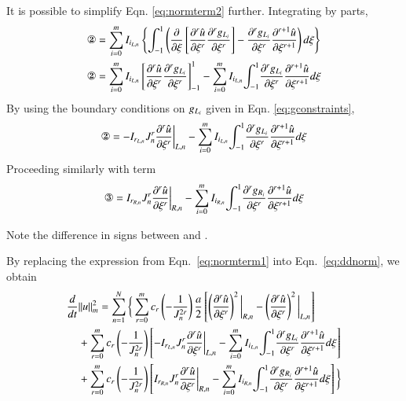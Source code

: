It is possible to simplify Eqn. \eqref{eq:normterm2} further.
Integrating by parts,
\begin{align}
 \text{\ding{173}}&=\sum^m_{i=0} \IL \l\{ \ioo \l( \ddxi{} \l[ \ddxir{\urd}{r}
\ddxir{\gL}{r} \r]
-\ddxir{\gL}{r} \ddxir{\urd}{r+1} \r) d\xi \r\}\\
\text{\ding{173}}&= \sum^m_{i=0} \IL \l[\ddxir{\urd}{r} \ddxir{\gL}{r}\r]^1_{-1}
- \sum^m_{i=0} \IL \ioo
\ddxir{\gL}{r} \ddxir{\urd}{r+1} d\xi
\end{align}
By using the boundary conditions on ${g_{L_i}}$ given in Eqn.
\eqref{eq:gconstraints},
\begin{equation}
\label{eq:exp2}
\text{\ding{173}}=-\IL[r] J_n^r \ddxir{\urd}{r}\bigg|_{L,n} - \sum^m_{i=0} \IL \ioo
\ddxir{\gL}{r} \ddxir{\urd}{r+1} d\xi 
\end{equation}
Proceeding similarly with term 
\begin{equation}
\label{eq:exp3}
\text{\ding{174}}=\IR[r] J_n^r\ddxir{\urd}{r}\bigg|_{R,n} - \sum^m_{i=0} \IR \ioo
\ddxir{\gR}{r}
\ddxir{\urd}{r+1} d\xi
\end{equation}

Note the difference in signs between  and .

By replacing the expression from Eqn.~\eqref{eq:normterm1} into Eqn.~\eqref{eq:ddnorm}, we
obtain
\begin{equation}
\begin{split}
\label{eq:newnorm}
 \DD{}{t}&||\uud||^2_m = \sum_{n=1}^{N}\bigg\{   
\sum^m_{r=0}c_r \l(  -\frac{1}{J_n^{2r}}\r)  \frac{a}{2}\l[\l(
\ddxir{\urd}{r}\r)^2\bigg|_{R,n} - \l(\ddxir{\urd}{r}\r)^2\bigg|_{L,n} \r]  \\
&+ \sum^m_{r=0} c_r \l( - \frac{1}{J_n^{2r}}\r)  \l[ -\IL[r] J_n^r\ddxir{\urd}{r}
\bigg|_{L,n} - \sum^m_{i=0} \IL \ioo \ddxir{\gL}{r} \ddxir{\urd}{r+1} d\xi\r]\\
&+ \sum^m_{r=0} c_r \l( - \frac{1}{J_n^{2r}}\r)  \l[ \IR[r] J_n^r\ddxir{\urd}{r}
\bigg|_{R,n} -\sum^m_{i=0} \IR \ioo \ddxir{\gR}{r} \ddxir{\urd}{r+1} d\xi\r]\bigg\}
\end{split}
\end{equation}


